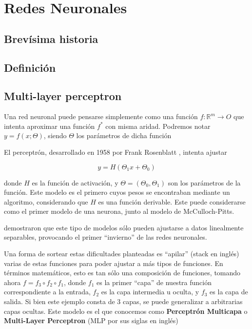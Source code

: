 \section{Redes Neuronales}

\subsection{Brevísima historia}
\subsection{Definición}
\subsection{Multi-layer perceptron}

Una red neuronal puede pensarse simplemente como una función $f: \mathbb{R}^m \rightarrow O$ que intenta aproximar una función $f^*$ con misma aridad. Podremos notar $ y = f(x; \Theta)$, siendo $\Theta$ los parámetros de dicha función

El perceptrón, desarrollado en 1958 por Frank Rosenblatt \cite{rosenblatt1958perceptron}, intenta ajustar

\begin{equation*}
    y = H(\Theta_1 x + \Theta_0)
\end{equation*}

donde $H$ es la función de activación, y $\Theta = (\Theta_0, \Theta_1)$ son los parámetros de la función. Este modelo es el primero cuyos pesos se encontraban mediante un algoritmo, considerando que $H$ es una función derivable. Este puede considerarse como el primer modelo de una neurona, junto al modelo de McCulloch-Pitts.

\citet{minsky1969perceptrons} demostraron que este tipo de modelos sólo pueden ajustarse a datos linealmente separables, provocando el primer ``invierno'' de las redes neuronales.

Una forma de sortear estas dificultades planteadas es ``apilar'' (stack en inglés) varias de estas funciones para poder ajustar a más tipos de funciones. En términos matemáticos, esto es tan sólo una composición de funciones, tomando ahora $f = f_3 \circ f_2 \circ f_1$, donde $f_1$ es la primer ``capa'' de nuestra función correspondiente a la entrada, $f_2$ es la capa intermedia u oculta, y $f_3$ es la capa de salida. Si bien este ejemplo consta de 3 capas, se puede generalizar a arbitrarias capas ocultas. Este modelo es el que conocemos como \textbf{Perceptrón Multicapa} o \textbf{Multi-Layer Perceptron} (MLP por sus siglas en inglés)






